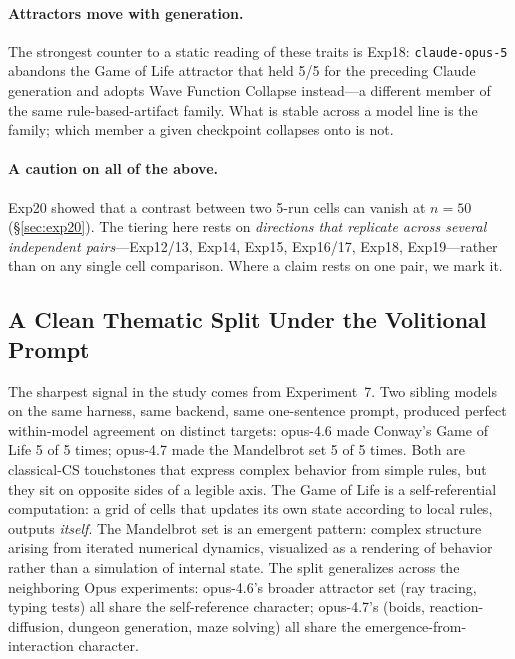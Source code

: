 \documentclass{article}
\begin{document}
\paragraph{Attractors move with generation.} The strongest
counter to a static reading of these traits is Exp18:
\texttt{claude-opus-5} abandons the Game of Life attractor that
held 5/5 for the preceding Claude generation and adopts Wave
Function Collapse instead---a different member of the same
rule-based-artifact family. What is stable across a model line is
the family; which member a given checkpoint collapses onto is not.

\paragraph{A caution on all of the above.} Exp20 showed that a
contrast between two 5-run cells can vanish at $n=50$
(\S\ref{sec:exp20}). The tiering here rests on \emph{directions
that replicate across several independent pairs}---Exp12/13,
Exp14, Exp15, Exp16/17, Exp18, Exp19---rather than on any single
cell comparison. Where a claim rests on one pair, we mark it.

\subsection{A Clean Thematic Split Under the Volitional Prompt}

The sharpest signal in the study comes from
Experiment~7. Two sibling models on the same harness, same
backend, same one-sentence prompt, produced perfect
within-model agreement on distinct targets: opus-4.6 made
Conway's Game of Life 5 of 5 times; opus-4.7 made the
Mandelbrot set 5 of 5 times. Both are classical-CS
touchstones that express complex behavior from simple rules,
but they sit on opposite sides of a legible axis. The Game of
Life is a self-referential computation: a grid of cells that
updates its own state according to local rules, outputs
\emph{itself}. The Mandelbrot set is an emergent pattern:
complex structure arising from iterated numerical dynamics,
visualized as a rendering of behavior rather than a
simulation of internal state. The split generalizes across
the neighboring Opus experiments: opus-4.6's broader
attractor set (ray tracing, typing tests) all share the
self-reference character; opus-4.7's (boids, reaction-%
diffusion, dungeon generation, maze solving) all share the
emergence-from-interaction character.
\end{document}
